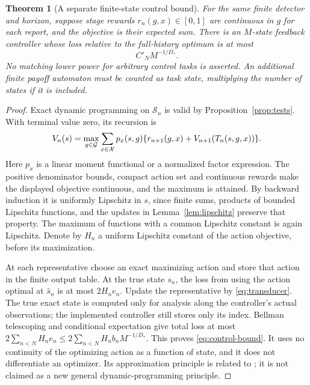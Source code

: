\documentclass[11pt]{amsart}
\newtheorem{theorem}{Theorem}[section]
\theoremstyle{definition}\newtheorem{definition}[theorem]{Definition}
\theoremstyle{remark}\newtheorem{remark}[theorem]{Remark}
\newcommand{\cX}{\mathcal X}\newcommand{\cS}{\mathcal S}
\begin{document}
\begin{theorem}[A separate finite-state control bound]\label{thm:control-bound}
For the same finite detector and horizon, suppose stage rewards
$r_n(g,x)\in[0,1]$ are continuous in $g$ for each report, and the objective
is their expected sum. There is an $M$-state feedback controller whose
loss relative to the full-history optimum is at most
\begin{equation}\label{eq:control-bound}
 C'_N M^{-1/D_*}.
\end{equation}
No matching lower power for arbitrary control tasks is asserted. An
additional finite payoff automaton must be counted as task state, multiplying
the number of states if it is included.
\end{theorem}
\begin{proof}
Exact dynamic programming on $\cS_n$ is valid by
Proposition~\ref{prop:tests}. With terminal value zero, its recursion is
\[
 V_n(s)=\max_{g\in\cG}\sum_{x\in\cX}p_x(s,g)
       \{r_{n+1}(g,x)+V_{n+1}(T_n(s,g,x))\}.
\]
Here $p_x$ is a linear moment functional or a normalized factor expression.
The positive denominator bounds, compact action set and continuous rewards
make the displayed objective continuous, and the maximum is attained.
By backward induction it is uniformly Lipschitz in $s$, since finite sums,
products of bounded Lipschitz functions, and the updates in
Lemma~\ref{lem:lipschitz} preserve that property. The maximum of functions
with a common Lipschitz constant is again Lipschitz. Denote by $H_n$ a
uniform Lipschitz constant of the action objective, before its maximization.

At each representative choose an exact maximizing action and store that
action in the finite output table. At the true state $s_n$, the loss from
using the action optimal at $\widehat s_n$ is at most $2H_ne_n$.
Update the representative by \eqref{eq:transducer}. The true exact state
is computed only for analysis along the controller's actual observations;
the implemented controller still stores only its index. Bellman telescoping
and conditional expectation give total loss at most
$2\sum_{n<N}H_ne_n\le2\sum_{n<N}H_nb_n M^{-1/D_*}$.
This proves \eqref{eq:control-bound}. It uses no continuity of the optimizing
action as a function of state, and it does not differentiate an optimizer.
Its approximation principle is related to \cite{Subramanian}; it is not
claimed as a new general dynamic-programming principle.
\end{proof}
\end{document}
